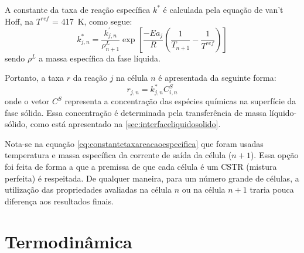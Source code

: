 A constante da taxa de reação específica $k^{*}$ é calculada pela
equação de van't Hoff, na $T^{ref}$ = \SI{417}{K}, como segue:
\begin{equation}
k^{*}_{j,n} = \dfrac{k^{'}_{j,n}} {\rho^{L}_{n+1}} \exp
\left[{\dfrac{-Ea_j}{R} \left (\dfrac{1}{T_{n+1}} -
\dfrac{1}{T^{ref}} \right )}\right]
\label{eq:constantetaxareacaoespecifica}
\end{equation}
sendo $\rho^L$ a massa específica da fase líquida.

Portanto, a taxa $r$ da reação $j$ na célula $n$ é apresentada da seguinte
forma:
\begin{equation}
r_{j,n} = k^{*}_{j,n}C^{S}_{i,n}
\label{eq:taxareacao}
\end{equation}
onde o vetor $C^{S}$ representa a concentração das espécies químicas na
superfície da fase sólida. Essa concentração é determinada pela transferência de
massa líquido-sólido, como está apresentado na \autoref{sec:interfaceliquidosolido}.

Nota-se na equação \autoref{eq:constantetaxareacaoespecifica} que foram usadas
temperatura e massa específica da corrente de saída da célula ($n+1$).
Essa opção foi feita de forma a que a premissa de que cada célula
é um CSTR (mistura perfeita) é respeitada.
De qualquer maneira, para um número grande de células, a utilização das propriedades
avaliadas na célula $n$ ou na célula $n+1$ traria pouca diferença aos resultados
finais.


\section{Termodinâmica} \label{sec:termodinamica}

